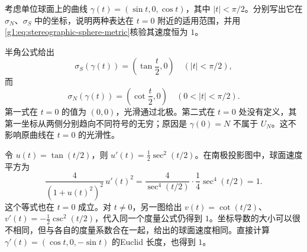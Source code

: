 \begin{exercise}
	\label{g1:ex:curve-through-stereographic-pole}
	考虑单位球面上的曲线 \(\gamma(t)=(\sin t,0,\cos t)\)，其中 \(|t|<\pi/2\)。分别写出它在 \(\sigma_N\)、\(\sigma_S\) 中的坐标，说明两种表达在 \(t=0\) 附近的适用范围，并用\eqref{g1:eq:stereographic-sphere-metric}核验其速度恒为 \(1\)。
\end{exercise}
\begin{solution}
	半角公式给出
	\[
		\sigma_S(\gamma(t))=\left(\tan\frac t2,0\right)
		\quad(|t|<\pi/2),
	\]
	而
	\[
		\sigma_N(\gamma(t))=\left(\cot\frac t2,0\right)
		\quad(0<|t|<\pi/2).
	\]
	第一式在 \(t=0\) 的值为 \((0,0)\)，光滑通过北极。第二式在 \(t=0\) 处没有定义，其第一坐标从两侧分别趋向不同符号的无穷；原因是 \(\gamma(0)=N\) 不属于 \(U_N\)。这不影响原曲线在 \(t=0\) 的光滑性。

	令 \(u(t)=\tan(t/2)\)，则 \(u'(t)=\tfrac12\sec^2(t/2)\)。在南极投影图中，球面速度平方为
	\[
		\frac{4}{(1+u(t)^2)^2}\,u'(t)^2
		=\frac{4}{\sec^4(t/2)}\cdot\frac14\sec^4(t/2)=1.
	\]
	这个等式也在 \(t=0\) 成立。对 \(t\ne0\)，另一图给出 \(v(t)=\cot(t/2)\)、\(v'(t)=-\tfrac12\csc^2(t/2)\)，代入同一个度量公式仍得到 \(1\)。坐标导数的大小可以很不相同，但与各自的度量系数合在一起，给出的球面速度相同。直接计算 \(\gamma'(t)=(\cos t,0,-\sin t)\) 的Euclid 长度，也得到 \(1\)。
\end{solution}

